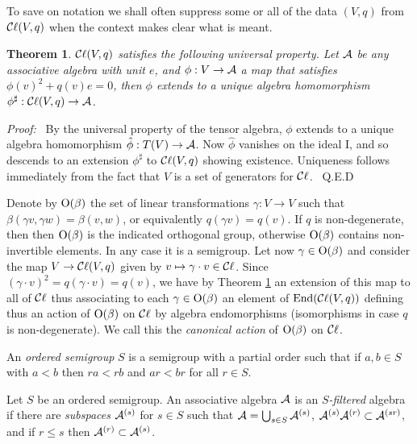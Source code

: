 \documentclass[12pt,titlepage]{article}
\def\cA{{\cal A}}
\def\cC{{\cal C}}
\def\Cl{{\cC\ell}}
\def\End{\hbox{End}}
\def\O{\hbox{O}}
\newtheorem{theorem}{Theorem}
\newenvironment{proof}{{\em Proof:\/}\ }{\ Q.E.D}
\begin{document}
To save on notation we shall often suppress some or all of the data
\((V,q)\) from \(\Cl(V,q)\) when the context makes clear what is meant.

\begin{theorem}\label{th:ucliff}%
\(\Cl(V,q)\) satisfies the following {\em universal property\/}. 
%
Let
\(\cA\) be any associative algebra with unit \(e\),
and \(\phi:V\to \cA\) a map that
satisfies \(\phi(v)^2+q(v)e=0\), then \(\phi\) extends to a unique algebra
homomorphism \linebreak \(\phi^\sharp:\Cl(V,q)\to \cA\).
\end{theorem}%
\begin{proof}%
By the universal property of the tensor algebra, \(\phi\) extends to a
unique algebra homomorphism \(\hat\phi:T(V)\to \cA\).
Now \(\hat\phi\) vanishes on the ideal I, and so descends to an extension
\(\phi^\sharp\) to \(\Cl(V,q)\) showing existence. Uniqueness follows
immediately from the fact that \(V\) is a set of generators for \(\Cl\).
\end{proof}%


Denote by \(\O(\beta)\)
\index{\(O(\beta)\)@\(\O(\beta)\)}%
 the set of linear transformations \(\gamma:V\to V\)
such that \(\beta(\gamma v,\gamma w)=\beta(v,w)\), or equivalently
\(q(\gamma v)=q(v)\). 
If \(q\) is non-degenerate, then
then  \(\O(\beta)\) is the indicated orthogonal group, otherwise
\(\O(\beta)\) contains non-invertible elements. In any case it is a
semigroup. 
Let now \(\gamma\in \O(\beta)\) and consider the map \(V\to\Cl(V,q)\) given by
\(v\mapsto \gamma\cdot v\in\Cl\). Since \((\gamma\cdot v)^2 = q(\gamma\cdot v)=q(v)\),
we have by Theorem \ref{th:ucliff} an extension of this map to all of
\(\Cl\) thus associating to each \(\gamma\in \O(\beta)\) an element of
\(\End(\Cl(V,q))\) defining thus  an action
of \(\O(\beta)\) on \(\Cl\) by algebra endomorphisms (isomorphisms
in case \(q\) is non-degenerate). We call this the {\em
canonical action\/}
%
 of \(\O(\beta)\) on \(\Cl\).


An {\em ordered semigroup\/} 
%
\(S\) is a semigroup with a partial order
such that if \(a,b\in S\) with \(a< b\) then  \(ra< rb\) and
\(ar< br\) for all \(r\in S\).


Let \(S\) be an ordered semigroup. An associative algebra \(\cA\) is an
{\em \(S\)-filtered\/}
%
 algebra if there are {\em subspaces\/}
\(\cA^{(s)}\) for \(s\in S\) such that \(\cA=\bigcup_{s\in S}\cA^{(s)}\),
\(\cA^{(s)}\cA^{(r)}\subset\cA^{(sr)}\), and if \(r\le s\) then
\(\cA^{(r)}\subset \cA^{(s)}\).
\end{document}
